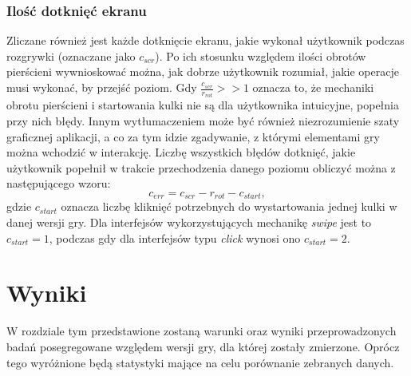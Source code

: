 \documentclass[a4paper,12pt,numbers=noenddot]{report}
\begin{document}
	\subsection{Ilość dotknięć ekranu}
Zliczane również jest każde dotknięcie ekranu, jakie wykonał użytkownik podczas rozgrywki (oznaczane jako $c_{scr}$). Po ich stosunku względem ilości obrotów pierścieni wywnioskować można, jak dobrze użytkownik rozumiał, jakie operacje musi wykonać, by przejść poziom. Gdy $\frac{c_{scr}}{r_{rot}} >> 1$ oznacza to, że mechaniki obrotu pierścieni i startowania kulki nie są dla użytkownika intuicyjne, popełnia przy nich błędy. Innym wytłumaczeniem może być również niezrozumienie szaty graficznej aplikacji, a co za tym idzie zgadywanie, z którymi elementami gry można wchodzić w interakcję. Liczbę wszystkich błędów dotknięć, jakie użytkownik popełnił w trakcie przechodzenia danego poziomu obliczyć można z następującego wzoru:
\begin{equation}
c_{err} = c_{scr} - r_{rot} - c_{start},
\end{equation}
gdzie  $c_{start}$ oznacza liczbę kliknięć potrzebnych do wystartowania jednej kulki w danej wersji gry. Dla interfejsów wykorzystujących mechanikę \textit{swipe} jest to $c_{start} = 1$, podczas gdy dla interfejsów typu \textit{click} wynosi ono $c_{start} = 2$.

\chapter{Wyniki}
W rozdziale tym przedstawione zostaną warunki oraz wyniki przeprowadzonych badań posegregowane względem wersji gry, dla której zostały zmierzone. Oprócz tego wyróżnione będą statystyki mające na celu porównanie zebranych danych.
\end{document}
